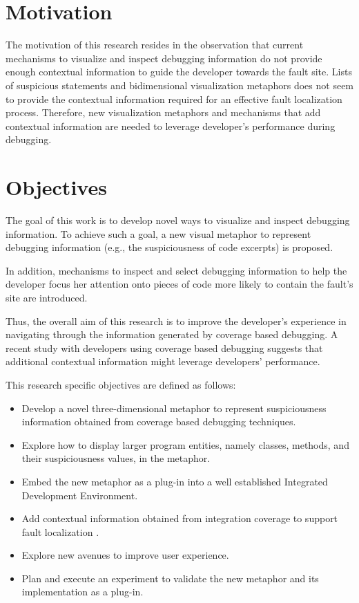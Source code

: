 \section{Motivation}

The motivation of this research resides in the observation that current
mechanisms to visualize and inspect debugging information do not provide enough
contextual information to guide the developer towards the fault site. Lists of
suspicious statements and  bidimensional visualization metaphors does not seem
to provide the contextual information required for an effective fault
localization process. Therefore, new visualization metaphors  and mechanisms
that add contextual information are needed to leverage developer's performance
during debugging.

\section{Objectives}

The goal of this work is to develop novel ways to visualize and inspect
debugging information. To achieve such a goal, a new visual metaphor to represent debugging information (e.g., the suspiciousness of code excerpts) is proposed.

In addition, mechanisms to inspect and select debugging information to help the
developer focus her attention onto pieces of code more likely to contain the
fault's site are introduced.

Thus, the overall aim of this research is to improve the developer's experience
in navigating through the information generated by coverage based debugging. A
recent study \cite{parnin2011automated} with developers using coverage based
debugging suggests that additional contextual information might leverage
developers' performance.

This research specific objectives are defined as follows:
\begin{itemize}
 \item Develop  a novel three-dimensional metaphor to represent suspiciousness
 information obtained from coverage based debugging techniques.
 \item Explore how to  display larger program entities,
  namely classes, methods, and their suspiciousness values, in the metaphor.
  \item Embed the new metaphor as a plug-in into a well
  established Integrated Development Environment.
  \item Add contextual information obtained from integration coverage to
  support fault localization \cite{souza13adding}.
  \item Explore new avenues to improve user experience.
  \item Plan and execute an experiment to validate the new metaphor and its
  implementation as a plug-in.
\end{itemize}

